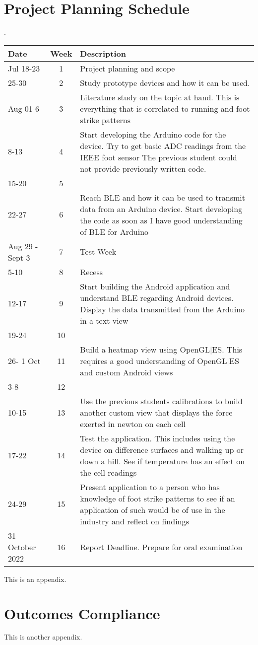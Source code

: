 \chapter{Project Planning Schedule}
\makeatletter{}\makeatother
\label{appen:derivations_bigramseg}
\begin{center}.
    \begin{tabular}{ | m{5em} |c|m{12cm}| }
      \hline
      \textbf{Date} & \textbf{Week} & \textbf{Description} \\
      \hline
      Jul 18-23 & 1 & Project planning and scope \\ 
      \hline
      25-30 & 2 & Study prototype devices and how it can be used.\\ 
      \hline
      Aug 01-6 & 3 & Literature study on the topic at hand. This is everything that is correlated to running and foot strike patterns \\ 
      \hline
      8-13 & 4 & Start developing the Arduino code for the device. Try to get basic ADC readings from the IEEE foot sensor The previous student could not provide previously written code. \\ 
      15-20& 5 &  \\ 
      \hline
      22-27 & 6 & Reach BLE and how it can be used to transmit data from an Arduino device. Start developing the code as soon as I have good understanding of BLE for Arduino \\ 
      \hline
      Aug 29 - Sept 3& 7 & Test Week \\ 
      \hline
      5-10 & 8 & Recess \\ 
      \hline
      12-17  & 9 & Start building the Android application and understand BLE regarding Android devices. Display the data transmitted from the Arduino in a text view \\ 
      19-24   & 10 \\ 
      \hline
      26- 1 Oct  & 11 & Build a heatmap view using OpenGL|ES. This requires a good understanding of OpenGL|ES and custom Android views  \\ 
      3-8  & 12\\ 
      \hline
      10-15 & 13 & Use the previous students calibrations to build another custom view that displays the force exerted in newton on each cell \\ 
      \hline
      17-22  & 14 & Test the application. This includes using the device on difference surfaces and walking up or down a hill. See if temperature has an effect on the cell readings \\ 
      \hline
      24-29 & 15 & Present application to a person who has knowledge of foot strike patterns to see if an application of such would be of use in the industry and reflect on findings \\ 
      \hline
      31 October 2022 & 16 & Report Deadline. Prepare for oral examination \\ 
      \hline
    \end{tabular}
    \end{center}

This is an appendix.

\chapter{Outcomes Compliance}
\makeatletter{}\makeatother
\label{appen:derivations_bigramseg}

This is another appendix.